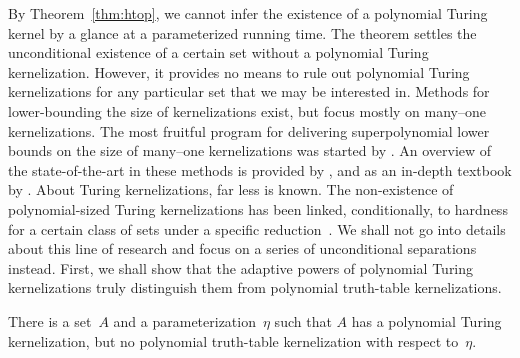 By Theorem~\ref{thm:htop}, we cannot infer the existence of a polynomial Turing kernel by a glance at a parameterized running time.
The theorem settles the unconditional existence of a certain set without a polynomial Turing kernelization.
However, it provides no means to rule out polynomial Turing kernelizations for any particular set that we may be interested in.
Methods for lower-bounding the size of kernelizations exist, but focus mostly on many--one kernelizations.
The most fruitful program for delivering superpolynomial lower bounds on the size of many--one kernelizations was started by \textcite{bodlaender2009problems}.
An overview of the state-of-the-art in these methods is provided by \textcite{kratsch2014recent}, and as an in-depth textbook by \textcite{fomin2019kernelization}.
About Turing kernelizations, far less is known.
The non-existence of polynomial-sized Turing kernelizations has been linked, conditionally, to hardness for a certain class of sets under a specific reduction~\parencite{hermelin2015completeness}.
We shall not go into details about this line of research and focus on a series of unconditional separations instead.
First, we shall show that the adaptive powers of polynomial Turing kernelizations truly distinguish them from polynomial truth-table kernelizations.
\begin{theorem}
\label{thm:ht}%
  There is a set~$A$ and a parameterization~$\eta$ such that $A$ has a polynomial Turing kernelization, but no polynomial truth-table kernelization with respect to~$\eta$.
\end{theorem}
